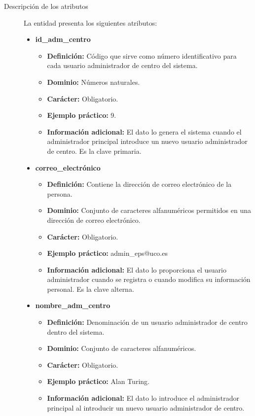 \begin{description}
   \item[Descripción de los atributos] La entidad presenta los siguientes
   atributos:

   \begin{itemize}
    \item \textbf{id\_adm\_centro}
      \begin{itemize}
         \item \textbf{Definición:} Código que sirve como número identificativo
               para cada usuario administrador de centro del sistema.
         \item \textbf{Dominio:} Números naturales.
         \item \textbf{Carácter:} Obligatorio.
         \item \textbf{Ejemplo práctico:} 9.
         \item \textbf{Información adicional:} El dato lo genera el sistema
               cuando el administrador principal introduce un nuevo usuario
               administrador de centro. Es la clave primaria.
      \end{itemize}
   \item \textbf{correo\_electrónico}
      \begin{itemize}
         \item \textbf{Definición:} Contiene la dirección de correo electrónico de la persona.
         \item \textbf{Dominio:} Conjunto de caracteres alfanuméricos permitidos en una dirección de correo electrónico.
         \item \textbf{Carácter:} Obligatorio.
         \item \textbf{Ejemplo práctico:} admin\_eps@uco.es
         \item \textbf{Información adicional:} El dato lo proporciona el usuario administrador cuando se registra o cuando modifica su información personal. Es la clave alterna.
      \end{itemize}
   \item \textbf{nombre\_adm\_centro}
      \begin{itemize}
         \item \textbf{Definición:} Denominación de un usuario administrador de
         centro dentro del sistema.
         \item \textbf{Dominio:} Conjunto de caracteres alfanuméricos.
         \item \textbf{Carácter:} Obligatorio.
         \item \textbf{Ejemplo práctico:} Alan Turing.
         \item \textbf{Información adicional:} El dato lo introduce el
         administrador principal al introducir un nuevo usuario administrador
         de centro.
      \end{itemize}
   \end{itemize}


\end{description}
